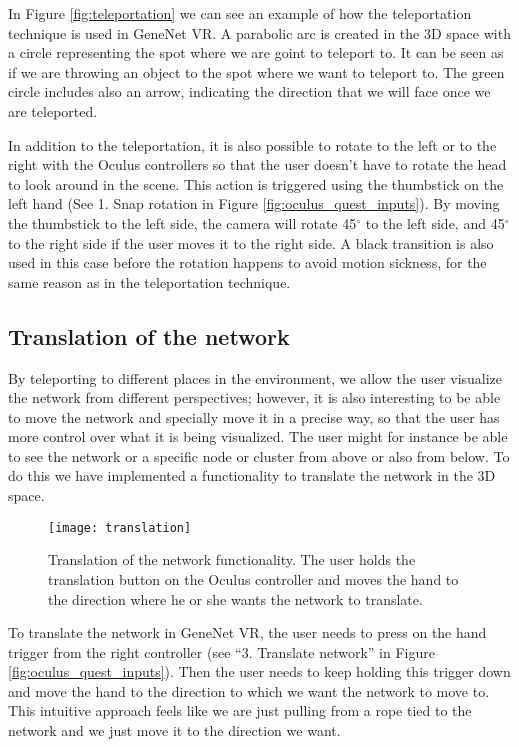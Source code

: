 In Figure \ref{fig:teleportation} we can see an example of how the teleportation technique is used in GeneNet VR. A  parabolic arc is created in the 3D space with a circle representing the spot where we are goint to teleport to. It can be seen as if we are throwing an object to the spot where we want to teleport to. The green circle includes also an arrow, indicating the direction that we will face once we are teleported.

In addition to the teleportation, it is also possible to rotate to the left or to the right with the Oculus controllers so that the user doesn't have to rotate the head to look around in the scene. This action is triggered using the thumbstick on the left hand (See 1. Snap rotation in Figure \ref{fig:oculus_quest_inputs}). By moving the thumbstick to the left side, the camera will rotate 45$^{\circ}$ to the left side, and 45$^{\circ}$ to the right side if the user moves it to the right side. A black transition is also used in this case before the rotation happens to avoid motion sickness, for the same reason as in the teleportation technique.

\subsection{Translation of the network}
By teleporting to different places in the environment, we allow the user visualize the network from different perspectives; however, it is also interesting to be able to move the network and specially move it in a precise way, so that the user has more control over what it is being visualized. The user might for instance be able to see the network or a specific node or cluster from above or also from below. To do this we have implemented a functionality to translate the network in the 3D space.

\begin{figure}[h!]
    \centering%
    \texttt{[image: translation]}
    \caption{Translation of the network functionality. The user holds the translation button on the Oculus controller and moves the hand to the direction where he or she wants the network to translate.}
    \label{fig:translation}
\end{figure}%

To translate the network in GeneNet VR, the user needs to press on the hand trigger from the right controller (see “3. Translate network” in Figure \ref{fig:oculus_quest_inputs}). Then the user needs to keep holding this trigger down and move the hand to the direction to which we want the network to move to. This intuitive approach feels like we are just pulling from a rope tied to the network and we just move it to the direction we want.


